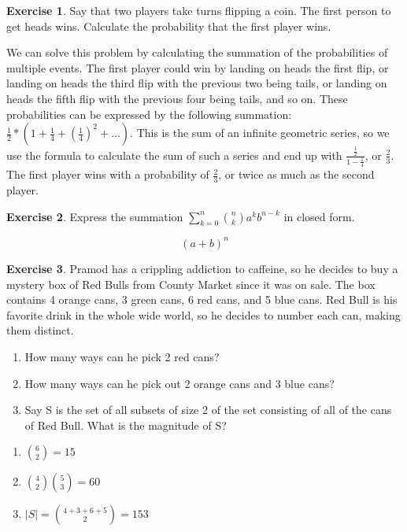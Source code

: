 \documentclass[12pt]{amsart}
\theoremstyle{definition}
\newtheorem{exercise}{Exercise}
\numberwithin{equation}{section}
\theoremstyle{plain}
\begin{document}
 

\begin{exercise}
Say that two players take turns flipping a coin. The first person to get heads wins. Calculate the probability that the first player wins.
\begin{answer}
    We can solve this problem by calculating the summation of the probabilities of multiple events. The first player could win by landing on heads the first flip, or landing on heads the third flip with the previous two being tails, or landing on heads the fifth flip with the previous four being tails, and so on. These probabilities can be expressed by the following summation: $\frac{1}{2}*(1+\frac{1}{4}+(\frac{1}{4})^2+...)$. This is the sum of an infinite geometric series, so we use the formula to calculate the sum of such a series and end up with $\frac{\frac{1}{2}}{1-\frac{1}{4}}$, or $\frac{2}{3}$. The first player wins with a probability of $\frac{2}{3}$, or twice as much as the second player.
\end{answer}
\end{exercise}

 

\begin{exercise}
Express the summation $\sum_{k=0}^{n}\binom{n}{k}a^kb^{n-k}$ in closed form.
\begin{answer}
\[
(a + b)^n
\]
\end{answer}
\end{exercise}

 

\begin{exercise}
Pramod has a crippling addiction to caffeine, so he decides to buy a mystery box of Red Bulls from County Market since it was on sale. The box contains 4 orange cans, 3 green cans, 6 red cans, and 5 blue cans. Red Bull is his favorite drink in the whole wide world, so he decides to number each can, making them distinct. 
\begin{enumerate}[label=\Alph*.]
\item How many ways can he pick 2 red cans?
\item How many ways can he pick out 2 orange cans and 3 blue cans?
\item Say S is the set of all subsets of size 2 of the set consisting of all of the cans of Red Bull. What is the magnitude of S?
\end{enumerate}
\begin{answer}
\begin{enumerate}[label=\Alph*.]
        \item $\binom{6}{2}=15$
        \item $\binom{4}{2}\binom{5}{3}=60$
        \item $|S| = \binom{4 + 3 + 6 + 5}{2}=153$
    \end{enumerate}
\end{answer}
\end{exercise}
\end{document}
